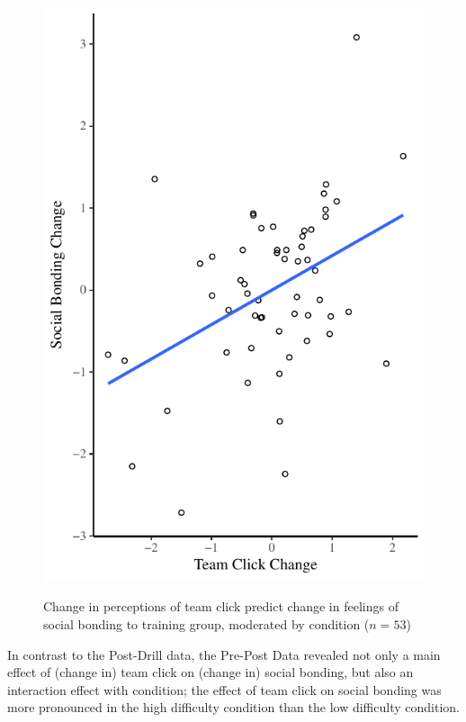 \begin{figure}
  \centering
    \includegraphics[width=0.5\linewidth,keepaspectratio] {images/groupClickBondingChangeCondition}
    \label{fig:groupClickBondingChangeCondition}
    \caption{Change in perceptions of team click predict change in feelings of social bonding to training group, moderated by condition ($n = 53$)}
\end{figure}

In contrast to the Post-Drill data, the Pre-Post Data revealed not  only a main effect of (change in) team click on (change in) social bonding, but also an interaction effect with condition; the effect of team click on social bonding was more pronounced in the high difficulty condition than the low difficulty condition.















